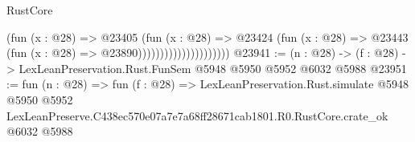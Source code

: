 \begin{lexlean}{RustCore}
\begin{coremodule}
                                      (fun (x : @28) =>
                                      @23405
                                        (fun (x : @28) =>
                                        @23424
                                          (fun (x : @28) =>
                                          @23443 (fun (x : @28) => @23890)))))))))))))))))))))
@23941 := (n : @28) -> (f : @28) -> LexLeanPreservation.Rust.FunSem @5948 @5950 @5952 @6032 @5988
@23951 := fun (n : @28) =>
  fun (f : @28) =>
  LexLeanPreservation.Rust.simulate
    @5948
    @5950
    @5952
    LexLeanPreserve.C438ec570e07a7e7a68ff28671cab1801.R0.RustCore.crate_ok
    @6032
    @5988
\end{coremodule}
\end{lexlean}

